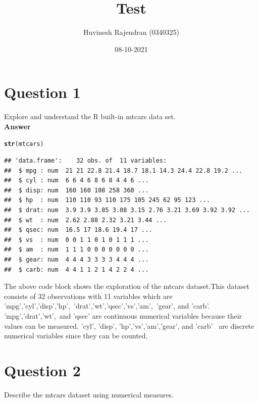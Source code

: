 \documentclass{article}\usepackage[]{graphicx}\usepackage[]{color}
\title{Test}
\author{Huvinesh Rajendran (0340325)}
\affil{Bachelor of Computer Science}
\date{08-10-2021}
\makeatletter
\newcommand{\hlstd}[1]{\textcolor[rgb]{0.345,0.345,0.345}{#1}}%
\newcommand{\hlkwd}[1]{\textcolor[rgb]{0.737,0.353,0.396}{\textbf{#1}}}%
\newenvironment{kframe}{%
 \def\at@end@of@kframe{}%
 \ifinner\ifhmode%
  \def\at@end@of@kframe{\end{minipage}}%
  \begin{minipage}{\columnwidth}%
 \fi\fi%
 \def\FrameCommand##1{\hskip\@totalleftmargin \hskip-\fboxsep
 \colorbox{shadecolor}{##1}\hskip-\fboxsep
     \hskip-\linewidth \hskip-\@totalleftmargin \hskip\columnwidth}%
 \MakeFramed {\advance\hsize-\width
   \@totalleftmargin\z@ \linewidth\hsize
   \@setminipage}}%
 {\par\unskip\endMakeFramed%
 \at@end@of@kframe}
\newenvironment{knitrout}{}{} %
\makeatother
\begin{document}
\maketitle{}


\section{Question 1}
Explore and understand the R built-in mtcars data set.\\


\textbf{Answer}\\
\begin{knitrout}
\color{fgcolor}\begin{kframe}
\begin{alltt}
\hlkwd{str}\hlstd{(mtcars)}
\end{alltt}
\begin{verbatim}
## 'data.frame':	32 obs. of  11 variables:
##  $ mpg : num  21 21 22.8 21.4 18.7 18.1 14.3 24.4 22.8 19.2 ...
##  $ cyl : num  6 6 4 6 8 6 8 4 4 6 ...
##  $ disp: num  160 160 108 258 360 ...
##  $ hp  : num  110 110 93 110 175 105 245 62 95 123 ...
##  $ drat: num  3.9 3.9 3.85 3.08 3.15 2.76 3.21 3.69 3.92 3.92 ...
##  $ wt  : num  2.62 2.88 2.32 3.21 3.44 ...
##  $ qsec: num  16.5 17 18.6 19.4 17 ...
##  $ vs  : num  0 0 1 1 0 1 0 1 1 1 ...
##  $ am  : num  1 1 1 0 0 0 0 0 0 0 ...
##  $ gear: num  4 4 4 3 3 3 3 4 4 4 ...
##  $ carb: num  4 4 1 1 2 1 4 2 2 4 ...
\end{verbatim}
\end{kframe}
\end{knitrout}

The above code block shows the exploration of the mtcars dataset.This dataset consists of 32 observations with 11 variables which are 'mpg','cyl','disp','hp',\ 'drat','wt','qsec','vs','am',\ 'gear', and 'carb'. 'mpg','drat','wt',\ and 'qsec' are continuous numerical variables because their values can be measured. 'cyl', 'disp', 'hp','vs','am','gear', and 'carb' \ are discrete numerical variables since they can be counted. 

\section{Question 2}
Describe the mtcars dataset using numerical measures.\\
\end{document}
